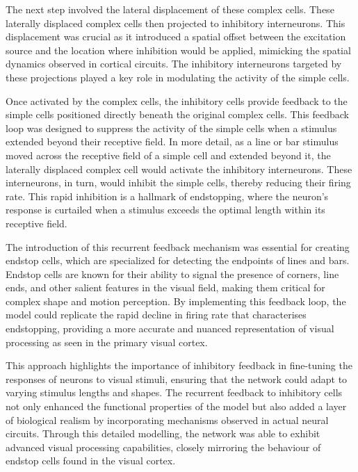 \documentclass[12pt]{article}
\begin{document}
The next step involved the lateral displacement of these complex cells. These laterally displaced complex cells then projected to inhibitory interneurons. This displacement was crucial as it introduced a spatial offset between the excitation source and the location where inhibition would be applied, mimicking the spatial dynamics observed in cortical circuits. The inhibitory interneurons targeted by these projections played a key role in modulating the activity of the simple cells.

Once activated by the complex cells, the inhibitory cells provide feedback to the simple cells positioned directly beneath the original complex cells. This feedback loop was designed to suppress the activity of the simple cells when a stimulus extended beyond their receptive field. In more detail, as a line or bar stimulus moved across the receptive field of a simple cell and extended beyond it, the laterally displaced complex cell would activate the inhibitory interneurons. These interneurons, in turn, would inhibit the simple cells, thereby reducing their firing rate. This rapid inhibition is a hallmark of endstopping, where the neuron's response is curtailed when a stimulus exceeds the optimal length within its receptive field.

The introduction of this recurrent feedback mechanism was essential for creating endstop cells, which are specialized for detecting the endpoints of lines and bars. Endstop cells are known for their ability to signal the presence of corners, line ends, and other salient features in the visual field, making them critical for complex shape and motion perception. By implementing this feedback loop, the model could replicate the rapid decline in firing rate that characterises endstopping, providing a more accurate and nuanced representation of visual processing as seen in the primary visual cortex.

This approach highlights the importance of inhibitory feedback in fine-tuning the responses of neurons to visual stimuli, ensuring that the network could adapt to varying stimulus lengths and shapes. The recurrent feedback to inhibitory cells not only enhanced the functional properties of the model but also added a layer of biological realism by incorporating mechanisms observed in actual neural circuits. Through this detailed modelling, the network was able to exhibit advanced visual processing capabilities, closely mirroring the behaviour of endstop cells found in the visual cortex.
\end{document}
